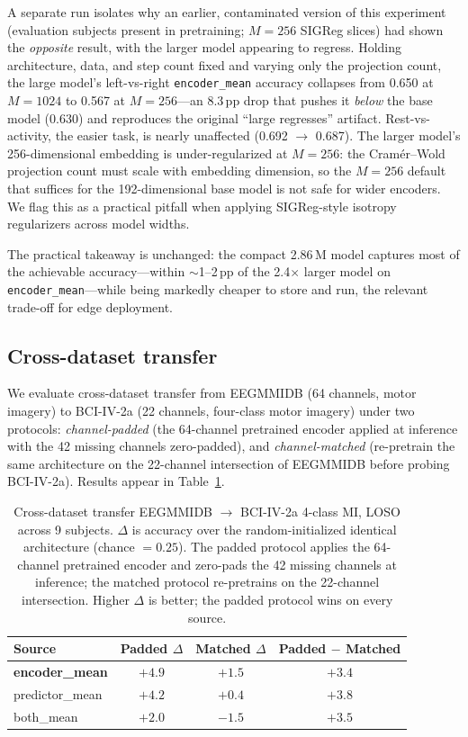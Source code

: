 A separate run isolates why an earlier, contaminated version of this
experiment (evaluation subjects present in pretraining; $M{=}256$ SIGReg
slices) had shown the \emph{opposite} result, with the larger model
appearing to regress. Holding architecture, data, and step count fixed and
varying only the projection count, the large model's left-vs-right
\texttt{encoder\_mean} accuracy collapses from 0.650 at $M{=}1024$ to 0.567
at $M{=}256$---an 8.3\,pp drop that pushes it \emph{below} the base model
(0.630) and reproduces the original ``large regresses'' artifact.
Rest-vs-activity, the easier task, is nearly unaffected (0.692 $\to$ 0.687).
The larger model's 256-dimensional embedding is under-regularized at
$M{=}256$: the Cram\'er--Wold projection count must scale with embedding
dimension, so the $M{=}256$ default that suffices for the 192-dimensional
base model is not safe for wider encoders. We flag this as a practical
pitfall when applying SIGReg-style isotropy regularizers across model
widths.

The practical takeaway is unchanged: the compact 2.86\,M model captures most
of the achievable accuracy---within $\sim$1--2\,pp of the 2.4$\times$ larger
model on \texttt{encoder\_mean}---while being markedly cheaper to store and
run, the relevant trade-off for edge deployment.

\subsection{Cross-dataset transfer}
\label{sec:results:transfer}

We evaluate cross-dataset transfer from EEGMMIDB (64 channels, motor
imagery) to BCI-IV-2a (22 channels, four-class motor imagery) under two
protocols: \emph{channel-padded} (the 64-channel pretrained encoder
applied at inference with the 42 missing channels zero-padded), and
\emph{channel-matched} (re-pretrain the same architecture on the 22-channel
intersection of EEGMMIDB before probing BCI-IV-2a). Results appear in
Table~\ref{tab:transfer}.

\begin{table}[t]
\caption{Cross-dataset transfer EEGMMIDB $\to$ BCI-IV-2a 4-class MI,
LOSO across 9 subjects. $\Delta$ is accuracy over the random-initialized
identical architecture (chance $=0.25$). The padded protocol applies the
64-channel pretrained encoder and zero-pads the 42 missing channels at
inference; the matched protocol re-pretrains on the 22-channel
intersection. Higher $\Delta$ is better; the padded protocol wins on every
source.}
\label{tab:transfer}
\centering
\small
\begin{tabular}{l c c c}
\toprule
Source & Padded $\Delta$ & Matched $\Delta$ & Padded $-$ Matched \\
\midrule
\textbf{encoder\_mean}   & $\mathbf{+4.9}$ & $+1.5$ & $+3.4$ \\
predictor\_mean & $+4.2$ & $+0.4$ & $+3.8$ \\
both\_mean      & $+2.0$ & $-1.5$ & $+3.5$ \\
\bottomrule
\end{tabular}
\end{table}

